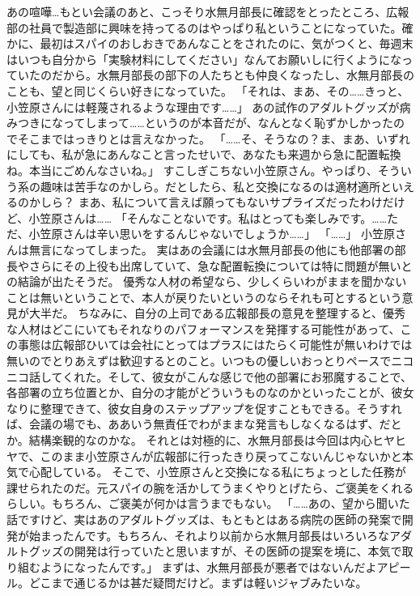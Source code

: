 あの喧嘩…もとい会議のあと、こっそり水無月部長に確認をとったところ、広報部の社員で製造部に興味を持ってるのはやっぱり私ということになっていた。確かに、最初はスパイのおしおきであんなことをされたのに、気がつくと、毎週末はいつも自分から「実験材料にしてください」なんてお願いしに行くようになっていたのだから。水無月部長の部下の人たちとも仲良くなったし、水無月部長のことも、望と同じくらい好きになっていた。
「それは、まあ、その……きっと、小笠原さんには軽蔑されるような理由です……」
あの試作のアダルトグッズが病みつきになってしまって……というのが本音だが、なんとなく恥ずかしかったのでそこまではっきりとは言えなかった。
「……そ、そうなの？ま、まあ、いずれにしても、私が急にあんなこと言ったせいで、あなたも来週から急に配置転換ね。本当にごめんなさいね。」
すこしぎこちない小笠原さん。やっぱり、そういう系の趣味は苦手なのかしら。だとしたら、私と交換になるのは適材適所といえるのかしら？
まあ、私について言えば願ってもないサプライズだったわけだけど、小笠原さんは……
「そんなことないです。私はとっても楽しみです。……ただ、小笠原さんは辛い思いをするんじゃないでしょうか……」
「……」
小笠原さんは無言になってしまった。
実はあの会議には水無月部長の他にも他部署の部長やさらにその上役も出席していて、急な配置転換については特に問題が無いとの結論が出たそうだ。
優秀な人材の希望なら、少しくらいわがままを聞かないことは無いということで、本人が戻りたいというのならそれも可とするという意見が大半だ。
ちなみに、自分の上司である広報部長の意見を整理すると、優秀な人材はどこにいてもそれなりのパフォーマンスを発揮する可能性があって、この事態は広報部ひいては会社にとってはプラスにはたらく可能性が無いわけでは無いのでとりあえずは歓迎するとのこと。いつもの優しいおっとりペースでニコニコ話してくれた。そして、彼女がこんな感じで他の部署にお邪魔することで、各部署の立ち位置とか、自分の才能がどういうものなのかといったことが、彼女なりに整理できて、彼女自身のステップアップを促すこともできる。そうすれば、会議の場でも、ああいう無責任でわがままな発言もしなくなるはず、だとか。結構楽観的なのかな。
それとは対極的に、水無月部長は今回は内心ヒヤヒヤで、このまま小笠原さんが広報部に行ったきり戻ってこないんじゃないかと本気で心配している。
そこで、小笠原さんと交換になる私にちょっとした任務が課せられたのだ。元スパイの腕を活かしてうまくやりとげたら、ご褒美をくれるらしい。もちろん、ご褒美が何かは言うまでもない。
「……あの、望から聞いた話ですけど、実はあのアダルトグッズは、もともとはある病院の医師の発案で開発が始まったんです。もちろん、それより以前から水無月部長はいろいろなアダルトグッズの開発は行っていたと思いますが、その医師の提案を境に、本気で取り組むようになったんです。」
まずは、水無月部長が悪者ではないんだよアピール。どこまで通じるかは甚だ疑問だけど。まずは軽いジャブみたいな。
